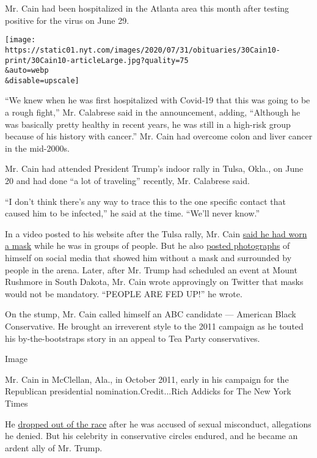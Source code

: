 Mr. Cain had been hospitalized in the Atlanta area this month after
testing positive for the virus on June 29.

\texttt{[image: https://static01.nyt.com/images/2020/07/31/obituaries/30Cain10-print/30Cain10-articleLarge.jpg?quality=75\\\&auto=webp\\\&disable=upscale]}

``We knew when he was first hospitalized with Covid-19 that this was
going to be a rough fight,'' Mr. Calabrese said in the announcement,
adding, ``Although he was basically pretty healthy in recent years, he
was still in a high-risk group because of his history with cancer.'' Mr.
Cain had overcome colon and liver cancer in the mid-2000s.

Mr. Cain had attended President Trump's indoor rally in Tulsa, Okla., on
June 20 and had done ``a lot of traveling'' recently, Mr. Calabrese
said.

``I don't think there's any way to trace this to the one specific
contact that caused him to be infected,'' he said at the time. ``We'll
never know.''

In a video posted to his website after the Tulsa rally, Mr. Cain
\href{https://hermancain.com/trump-tulsa-rally-i-was-there/?utm_source=twitter\&utm_medium=thenewvoice\&utm_content=2020-06-22}{said
he had worn a mask} while he was in groups of people. But he also
\href{https://twitter.com/THEHermanCain/status/1274489632886075398?s=20}{posted
photographs} of himself on social media that showed him without a mask
and surrounded by people in the arena. Later, after Mr. Trump had
scheduled an event at Mount Rushmore in South Dakota, Mr. Cain wrote
approvingly on Twitter that masks would not be mandatory. ``PEOPLE ARE
FED UP!'' he wrote.

On the stump, Mr. Cain called himself an ABC candidate --- American
Black Conservative. He brought an irreverent style to the 2011 campaign
as he touted his by-the-bootstraps story in an appeal to Tea Party
conservatives.

Image

Mr. Cain in McClellan, Ala., in October 2011, early in his campaign for
the Republican presidential nomination.Credit...Rich Addicks for The New
York Times

He
\href{https://www.nytimes.com/2011/12/04/us/politics/herman-cain-suspends-his-presidential-campaign.html}{dropped
out of the race} after he was accused of sexual misconduct, allegations
he denied. But his celebrity in conservative circles endured, and he
became an ardent ally of Mr. Trump.

